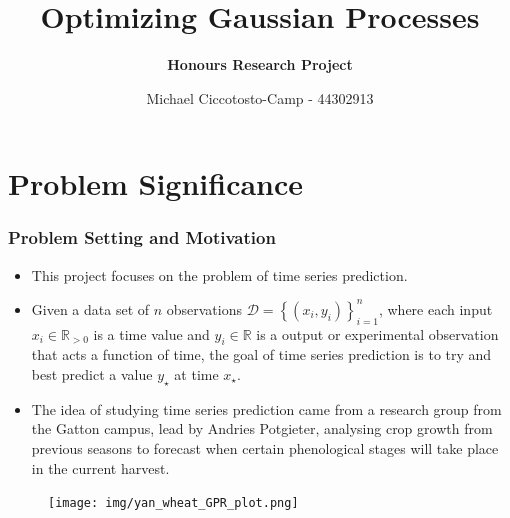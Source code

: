 \documentclass[10pt,hyperref={pdfpagelabels=false},xcolor=table]{beamer}
\title{Optimizing Gaussian Processes}
\author[Michael Ciccotosto-Camp]{{\bf Honours Research Project}}
\date{
Michael Ciccotosto-Camp - 44302913 \\
}
\begin{document}
\maketitle

\section{Problem Significance}

\begin{frame}
    \frametitle{Problem Setting and Motivation}
    \begin{itemize}
        \item This project focuses on the problem of time series prediction.
        \item Given a data set of $n$ observations $\mathcal{D} = \left\{ \left( x_i , y_i \right) \right\}_{i=1}^{n}$, where each input $x_i \in \mathbb{R}_{>0}$ is a time value and $y_i \in \mathbb{R}$ is a output or experimental observation that acts a function of time, the goal of time series prediction is to try and best predict a value $y_{\star}$ at time $x_{\star}$.
        \item The idea of studying time series prediction came from a research group from the Gatton campus, lead by Andries Potgieter, analysing crop growth from previous seasons to forecast when certain phenological stages will take place in the current harvest.
    \end{itemize}
    \begin{figure}
        \centering
        \texttt{[image: img/yan\_wheat\_GPR\_plot.png]}
    \end{figure}
\end{frame}
\end{document}
